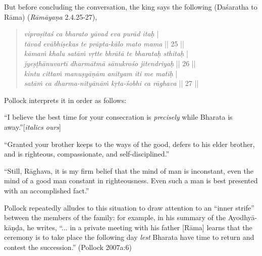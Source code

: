 But before concluding the conversation, the king says the following (Daśaratha to Rāma) ({\sl Rāmāyaṇa} 2.4.25-27), 
\begin{quote}
{{\sl viproṣitaś ca bharato yāvad eva purād itaḥ}}\label{verse11} |\\
{{\sl tāvad evābhiṣekas te prāpta-kālo mato mama}} || 25 ||\\
{\sl kāmaṁ khalu satāṁ vṛtte bhrātā te bharataḥ sthitaḥ}\label{verse12} |\\
{\sl jyeṣṭhānuvartī dharmātmā sānukrośo jitendriyaḥ} || 26 ||\\
{\sl kintu cittaṁ manuṣyāṇām anityam iti me matiḥ}\label{verse13} |\\
{\sl satāṁ ca dharma-nityānāṁ kṛta-śobhi ca rāghava} || 27 ||
\end{quote}

Pollock interprets it in order as follows:

\begin{myquote}
“I believe the best time for your consecration is {\sl precisely} while Bharata is away.”\hfill [{\sl italics ours}]
								 	 
“Granted your brother keeps to the ways of the good, defers to his elder brother, and is righteous, compassionate, and self-disciplined.”
		 
“Still, Rāghava, it is my firm belief that the mind of man is inconstant, even the mind of a good man constant in righteousness. Even such a man is best presented with an accomplished fact.”	
\end{myquote}

Pollock repeatedly alludes to this situation to draw attention to an “inner strife” between the members of the family: for example, in his summary of the Ayodhyā-kāṇḍa, he writes, “... in a private meeting with his father [Rāma] learns that the ceremony is to take place the following day {\sl lest} Bharata have time to return and contest the succession.” (Pollock 2007a:6)

